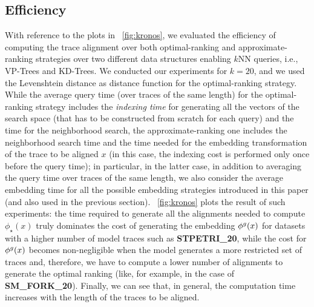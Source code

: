 \subsection{Efficiency}\label{subsec:efficio}
With reference to the plots in \figurename~\ref{fig:kronos}, we evaluated the efficiency of computing the trace alignment over both optimal-ranking   and approximate-ranking   strategies over two different data structures enabling $k$NN queries, i.e., VP-Trees and KD-Trees. We conducted our experiments for $k=20$, and we used the Levenshtein distance as distance function for the optimal-ranking strategy. While the average query time (over traces of the same length) for the optimal-ranking strategy includes the \textit{indexing time} for generating all the vectors of the search space (that has to be constructed from scratch for each query) and the time for the neighborhood search, the approximate-ranking one includes the neighborhood search time and the time needed for the embedding transformation of the trace to be aligned $x$ (in this case, the indexing cost is performed only once before the query time); in particular, in the latter case, in addition to averaging the query time over traces of the same length, we also consider the average embedding time for all the possible embedding strategies introduced in this paper (and also used in the previous section). \figurename~\ref{fig:kronos} plots the result of such experiments: the time required to generate all the alignments needed to compute $\phi_\star(x)$ truly dominates the cost of generating the embedding $\phi^{g}(x)$ for datasets with a higher number of model traces such as \textbf{STPETRI\_20}, while the cost for $\phi^{g}(x)$ becomes non-negligible when the model generates a more restricted set of traces and, therefore, we have to compute a lower number of alignments to generate the optimal ranking (like, for example, in the case of \textbf{SM\_FORK\_20}). Finally, we can see that, in general, the computation time increases with the length of the traces to be aligned.
